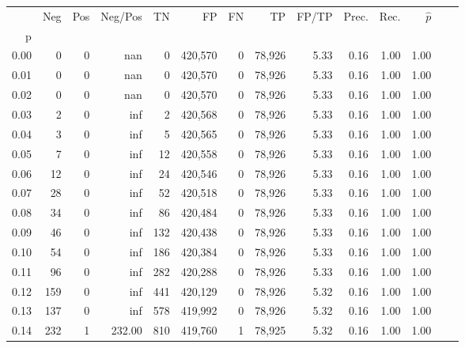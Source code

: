\begin{tabular}{rrrrrrrrrrrrrr}
\toprule
{} &     Neg &    Pos & Neg/Pos &       TN &       FP &      FN &      TP & FP/TP & Prec. &  Rec. & $\hat{p}$ \\
p    &         &        &         &          &          &         &         &       &       &       &           \\
\midrule
0.00 &       0 &      0 &     nan &        0 &  420,570 &       0 &  78,926 &  5.33 &  0.16 &  1.00 &      1.00 \\
0.01 &       0 &      0 &     nan &        0 &  420,570 &       0 &  78,926 &  5.33 &  0.16 &  1.00 &      1.00 \\
0.02 &       0 &      0 &     nan &        0 &  420,570 &       0 &  78,926 &  5.33 &  0.16 &  1.00 &      1.00 \\
0.03 &       2 &      0 &     inf &        2 &  420,568 &       0 &  78,926 &  5.33 &  0.16 &  1.00 &      1.00 \\
0.04 &       3 &      0 &     inf &        5 &  420,565 &       0 &  78,926 &  5.33 &  0.16 &  1.00 &      1.00 \\
0.05 &       7 &      0 &     inf &       12 &  420,558 &       0 &  78,926 &  5.33 &  0.16 &  1.00 &      1.00 \\
0.06 &      12 &      0 &     inf &       24 &  420,546 &       0 &  78,926 &  5.33 &  0.16 &  1.00 &      1.00 \\
0.07 &      28 &      0 &     inf &       52 &  420,518 &       0 &  78,926 &  5.33 &  0.16 &  1.00 &      1.00 \\
0.08 &      34 &      0 &     inf &       86 &  420,484 &       0 &  78,926 &  5.33 &  0.16 &  1.00 &      1.00 \\
0.09 &      46 &      0 &     inf &      132 &  420,438 &       0 &  78,926 &  5.33 &  0.16 &  1.00 &      1.00 \\
0.10 &      54 &      0 &     inf &      186 &  420,384 &       0 &  78,926 &  5.33 &  0.16 &  1.00 &      1.00 \\
0.11 &      96 &      0 &     inf &      282 &  420,288 &       0 &  78,926 &  5.33 &  0.16 &  1.00 &      1.00 \\
0.12 &     159 &      0 &     inf &      441 &  420,129 &       0 &  78,926 &  5.32 &  0.16 &  1.00 &      1.00 \\
0.13 &     137 &      0 &     inf &      578 &  419,992 &       0 &  78,926 &  5.32 &  0.16 &  1.00 &      1.00 \\
0.14 &     232 &      1 &  232.00 &      810 &  419,760 &       1 &  78,925 &  5.32 &  0.16 &  1.00 &      1.00 \\

\end{tabular}
